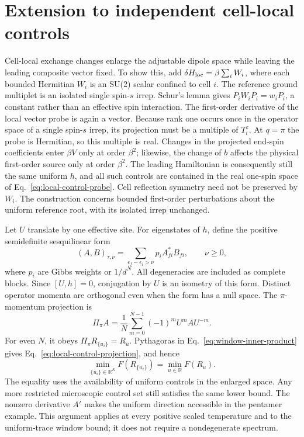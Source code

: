 \section{Extension to independent cell-local controls}
\label{app:local-controls}

Cell-local exchange changes enlarge the adjustable dipole space while
leaving the leading composite vector fixed. To show this, add
$\delta H_{\rm loc}=\beta\sum_i W_i$, where each bounded Hermitian $W_i$
is an SU(2) scalar confined to cell $i$. The reference ground multiplet is
an isolated single spin-$s$ irrep. Schur's lemma gives
$P_iW_iP_i=w_iP_i$, a constant rather than an effective spin interaction.
The first-order derivative of the local vector probe is again a vector.
Because rank one occurs once in the operator space of a single spin-$s$
irrep, its projection must be a multiple of $T_i^z$. At $q=\pi$ the
probe is Hermitian, so this multiple is real. Changes in the projected
end-spin coefficients enter $\beta V$ only at order $\beta^2$;
likewise, the change of $b$ affects the physical first-order source only
at order $\beta^2$. The leading Hamiltonian is consequently still the
same uniform $h$, and all such controls are contained in the real
one-spin space of Eq.~\eqref{eq:local-control-probe}. Cell reflection
symmetry need not be preserved by $W_i$.
The construction concerns bounded first-order perturbations about the
uniform reference root, with its isolated irrep unchanged.

Let $U$ translate by one effective site. For eigenstates of $h$, define
the positive semidefinite sesquilinear form
\begin{equation}
 (A,B)_{\tau,\nu}=\sum_{\epsilon_f-\epsilon_i>\nu}
 p_i A_{fi}^*B_{fi},\qquad \nu\ge0,
 \label{eq:window-inner-product}
\end{equation}
where $p_i$ are Gibbs weights or $1/d^N$. All degeneracies are included
as complete blocks. Since $[U,h]=0$, conjugation by $U$ is an isometry
of this form. Distinct operator momenta are orthogonal even when the
form has a null space. The $\pi$-momentum projection is
\begin{equation}
 \Pi_\pi A=\frac1N\sum_{m=0}^{N-1}(-1)^mU^m A U^{-m}.
\end{equation}
For even $N$, it obeys
$\Pi_\pi R_{\{u_i\}}=R_{\bar u}$. Pythagoras in
Eq.~\eqref{eq:window-inner-product} gives
Eq.~\eqref{eq:local-control-projection}, and hence
\begin{equation}
 \min_{\{u_i\}\in\mathbb R^N}F(R_{\{u_i\}})
 =\min_{u\in\mathbb R}F(R_u).
 \label{eq:local-control-optimum}
\end{equation}
The equality uses the availability of uniform controls in the enlarged
space. Any more restricted microscopic control set still satisfies the
same lower bound. The nonzero derivative $A'$ makes the uniform direction
accessible in the pentamer example. This argument applies at every
positive scaled temperature and to the uniform-trace window bound;
it does not require a nondegenerate spectrum.

